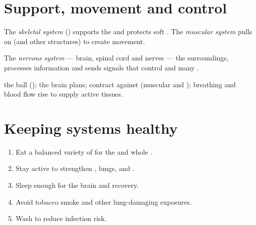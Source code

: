 \section{Support, movement and control}

\begin{definition}\label{def:g4:body-systems:move}
The \emph{skeletal system} () supports the
 and protects soft . The \emph{muscular
system} pulls on  (and other structures) to
create movement.
\end{definition}

\begin{definition}\label{def:g4:body-systems:nervous}
The \emph{nervous system} --- brain, spinal cord
and nerves ---  the surroundings, processes information and
sends signals that control  and many .
\end{definition}

\begin{example}\label{ex:g4:body-systems:ball}
  the ball (); the brain plans;  contract
against  (muscular and ); breathing and blood flow
rise to supply active tissues.
\end{example}

\section{Keeping systems healthy}

\begin{method}\label{met:g4:body-systems:habits}
\begin{enumerate}
  \item Eat a balanced variety of  for the  and
        whole .
  \item Stay active to strengthen , lungs,  and .
  \item Sleep enough for the brain and recovery.
  \item Avoid tobacco smoke and other lung-damaging exposures.
  \item Wash  to reduce infection risk.
\end{enumerate}
\end{method}

